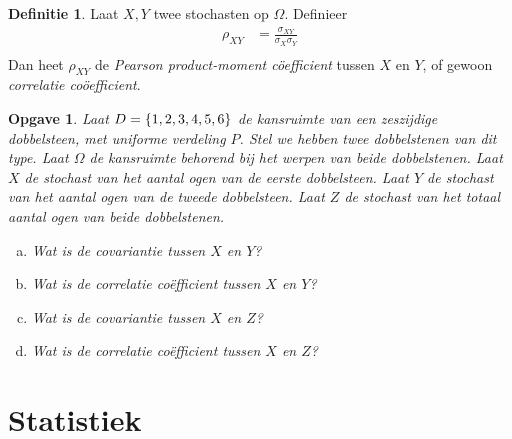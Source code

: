 \documentclass[a4paper]{book}
\newtheorem{exercise}[theorem]{Opgave}
\theoremstyle{definition}
\newtheorem{definition}[theorem]{Definitie}
\begin{document}
\begin{definition}
    Laat $X,Y$ twee stochasten op $\Omega$.
    Definieer
    \begin{align*}
        \rho_{XY} &= \frac{\sigma_{XY}}{\sigma_X \sigma_Y} \\
    \end{align*}
    Dan heet $\rho_{XY}$ de \emph{Pearson product-moment c\"oefficient} tussen $X$ en $Y$, of gewoon \emph{correlatie co\"oefficient}.
\end{definition}

\begin{exercise}
    Laat $D = \set{1,2,3,4,5,6}$ de kansruimte van een zeszijdige dobbelsteen, met uniforme verdeling $P$.
    Stel we hebben twee dobbelstenen van dit type. Laat $\Omega$ de kansruimte behorend bij het werpen van beide dobbelstenen.
    Laat $X$ de stochast van het aantal ogen van de eerste dobbelsteen.
    Laat $Y$ de stochast van het aantal ogen van de tweede dobbelsteen.
    Laat $Z$ de stochast van het totaal aantal ogen van beide dobbelstenen.
    \begin{enumerate}[a.]
    \item Wat is de covariantie tussen $X$ en $Y$?
    \item Wat is de correlatie co\"efficient tussen $X$ en $Y$?
    \item Wat is de covariantie tussen $X$ en $Z$?
    \item Wat is de correlatie co\"efficient tussen $X$ en $Z$?
    \end{enumerate}
\end{exercise}


\chapter{Statistiek}
\end{document}
